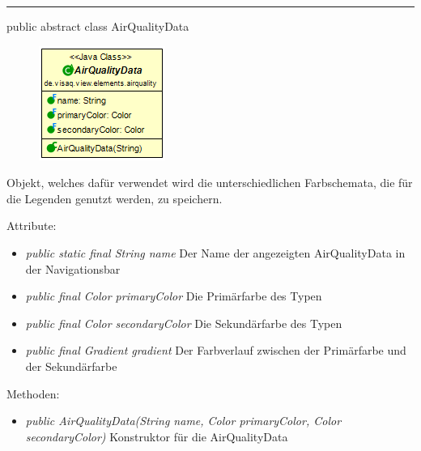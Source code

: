 \clearpage %
\rule{\textwidth}{0.4pt}
public abstract class AirQualityData

\begin{minipage}{0.3\textwidth}
    \begin{figure}[H]
        \includegraphics[scale = 0.6]{media/frontend/view/de.view.elements.airquality/AirQualityData_Class.png}
    \end{figure}
    \end{minipage} \hfill
    \begin{minipage}{0.6\textwidth}
Objekt, welches dafür verwendet wird die unterschiedlichen Farbschemata, die für die Legenden genutzt werden, zu speichern.
\end{minipage}

Attribute:
\begin{itemize}
    \item \emph{public static final String name} Der Name der angezeigten AirQualityData in der Navigationsbar
    \item \emph{public final Color primaryColor} Die Primärfarbe des Typen
	\item \emph{public final Color secondaryColor} Die Sekundärfarbe des Typen
	\item \emph{public final Gradient gradient}	Der Farbverlauf zwischen der Primärfarbe und der Sekundärfarbe
\end{itemize}
Methoden:
\begin{itemize}
    \item \emph{public AirQualityData(String name, Color primaryColor, Color secondaryColor)} Konstruktor für die AirQualityData
\end{itemize}
